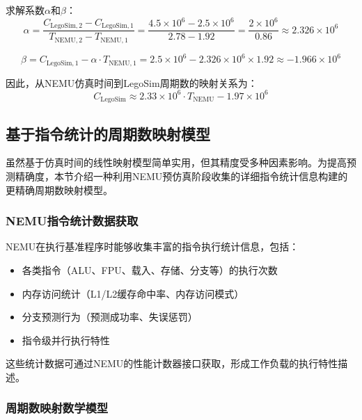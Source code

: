\documentclass[bachelor]{thesis-uestc}
\begin{document}
    求解系数$\alpha$和$\beta$： \begin{equation} \alpha = \frac{C_{\textrm{LegoSim},2} - C_{\textrm{LegoSim},1}}{T_{\textrm{NEMU},2} - T_{\textrm{NEMU},1}} = \frac{4.5 \times 10^6 - 2.5 \times 10^6}{2.78 - 1.92} = \frac{2 \times 10^6}{0.86} \approx 2.326 \times 10^6 \end{equation}
    
    \begin{equation} \beta = C_{\textrm{LegoSim},1} - \alpha \cdot T_{\textrm{NEMU},1} = 2.5 \times 10^6 - 2.326 \times 10^6 \times 1.92 \approx -1.966 \times 10^6 \end{equation}
    
    因此，从NEMU仿真时间到LegoSim周期数的映射关系为： \begin{equation} C_{\textrm{LegoSim}} \approx 2.33 \times 10^6 \cdot T_{\textrm{NEMU}} - 1.97 \times 10^6 \end{equation}



    \subsection{基于指令统计的周期数映射模型}

虽然基于仿真时间的线性映射模型简单实用，但其精度受多种因素影响。为提高预测精确度，本节介绍一种利用NEMU预仿真阶段收集的详细指令统计信息构建的更精确周期数映射模型。

\subsubsection{NEMU指令统计数据获取}

NEMU在执行基准程序时能够收集丰富的指令执行统计信息，包括：
\begin{itemize}
  \item 各类指令（ALU、FPU、载入、存储、分支等）的执行次数
  \item 内存访问统计（L1/L2缓存命中率、内存访问模式）
  \item 分支预测行为（预测成功率、失误惩罚）
  \item 指令级并行执行特性
\end{itemize}
这些统计数据可通过NEMU的性能计数器接口获取，形成工作负载的执行特性描述。

\subsubsection{周期数映射数学模型}
\end{document}
